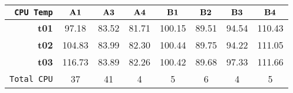 \begin{tabular}{r|ccccccc}\cline{2-8}
\tt CPU Temp&$\bf A1$&$\bf A3$&$\bf A4$&$\bf B1$&$\bf B2$&$\bf B3$&$\bf B4$\\\hline
\bf t01& 97.18& 83.52& 81.71& 100.15& 89.51& 94.54& 110.43\\
\bf t02& 104.83& 83.99& 82.30& 100.44& 89.75& 94.22& 111.05\\
\bf t03& 116.73& 83.89& 82.26& 100.42& 89.68& 97.33& 111.66\\
\hline
\tt Total CPU& 37& 41& 4& 5& 6& 4& 5\\
\end{tabular}
